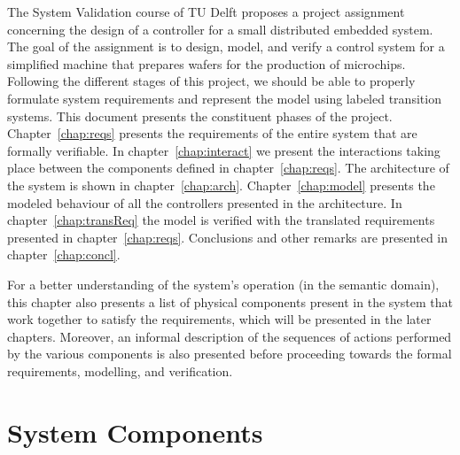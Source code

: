 
The System Validation course of TU Delft proposes a project assignment concerning the design of a controller for a small distributed embedded system.
The goal of the assignment is to design, model, and verify a control system for a simplified machine that prepares wafers for the production of microchips.
Following the different stages of this project, we should be able to properly formulate system requirements and represent the model using labeled transition systems.
This document presents the constituent phases of the project. Chapter~\ref{chap:reqs} presents the requirements of the entire system that are formally verifiable. In chapter~\ref{chap:interact} we present the interactions taking place between the components defined in chapter~\ref{chap:reqs}. The architecture of the system is shown in chapter~\ref{chap:arch}. Chapter~\ref{chap:model} presents the modeled behaviour of all the controllers presented in the architecture. In chapter~\ref{chap:transReq} the model is verified with the translated requirements presented in chapter~\ref{chap:reqs}. Conclusions and other remarks are presented in chapter~\ref{chap:concl}.

For a better understanding of the system's operation (in the semantic domain), this chapter also presents a list of physical components present in the system that work together to satisfy the requirements, which will be presented in the later chapters. Moreover, an informal description of the sequences of actions performed by the various components is also presented before proceeding towards the formal requirements, modelling, and verification.

\section{System Components}

